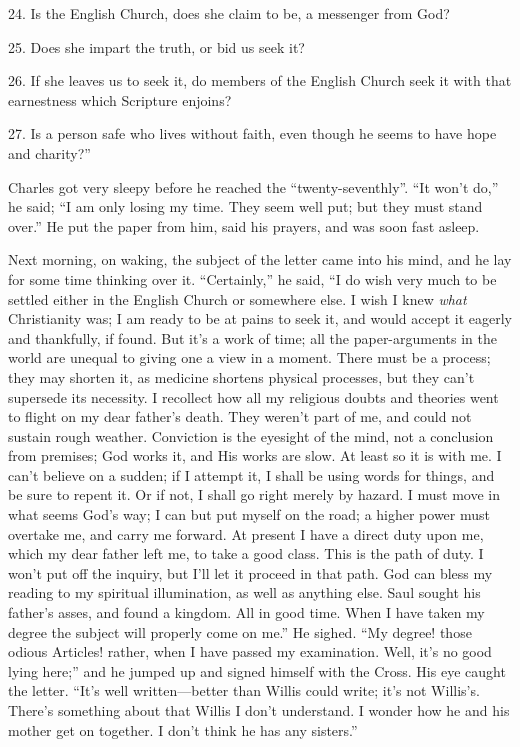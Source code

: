 24. Is the English Church, does she claim to be, a messenger from
God?

25. Does she impart the truth, or bid us seek it?

26. If she leaves us to seek it, do members of the English Church
seek it with that earnestness which Scripture enjoins?

27. Is a person safe who lives without faith, even though he seems
to have hope and charity?''

Charles got very sleepy before he reached the
``twenty-seventhly''. ``It won't do,'' he said;
``I am only losing my time. They seem well put; but they must
stand over.'' He put the paper from him, said his prayers, and was
soon fast asleep.

Next morning, on waking, the subject of the letter came into his
mind, and he lay for some time thinking over it.
``Certainly,'' he said, ``I do wish very much to be
settled either in the English Church or somewhere else. I wish I knew \emph{what}
Christianity was; I am ready to be at pains to seek it, and would
accept it eagerly and thankfully, if found. But it's a work of time;
all the paper-arguments in the world are unequal to giving one a view
in a moment. There must be a process; they may shorten it, as medicine
shortens physical processes, but they can't supersede its necessity. I
recollect how all my religious doubts and theories went to flight on
my dear father's death. They weren't part of me, and could not sustain
rough weather. Conviction is the eyesight of the mind, not a
conclusion from premises; God works it, and His works are slow. At
least so it is with me. I can't believe on a sudden; if I attempt it,
I shall be using words for things, and be sure to repent it. Or if
not, I shall go right merely by hazard. I must move in what seems God's
way; I can but put myself on the road; a higher power must overtake
me, and carry me forward. At present I have a direct duty upon me,
which my dear father left me, to take a good class. This is the path
of duty. I won't put off the inquiry, but I'll let it proceed in that
path. God can bless my reading to my spiritual illumination, as
well as anything else. Saul sought his father's asses, and found a
kingdom. All in good time. When I have taken my degree the subject
will properly come on me.'' He sighed. ``My degree! those
odious Articles! rather, when I have passed my examination. Well, it's
no good lying here;'' and he jumped up and signed himself with the
Cross. His eye caught the letter. ``It's well written—better
than Willis could write; it's not Willis's. There's something about
that Willis I don't understand. I wonder how he and his mother get on
together. I don't think he has any sisters.''

